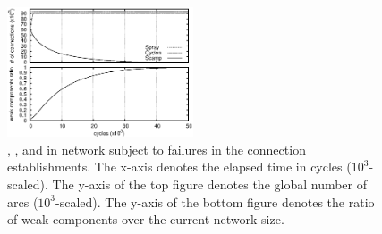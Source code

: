 \begin{figure}
  \centering \includegraphics[width=0.49\textwidth]{img/degen.eps}
  \caption{\label{fig:degeneration}\CYCLON, \SCAMP, and \SPRAY in network
    subject to failures in the connection establishments. The x-axis denotes
    the elapsed time in cycles ($10^3$-scaled). The y-axis of the top figure
    denotes the global number of arcs ($10^3$-scaled). The y-axis of the bottom
    figure denotes the ratio of weak components over the current network size.}
\end{figure}

